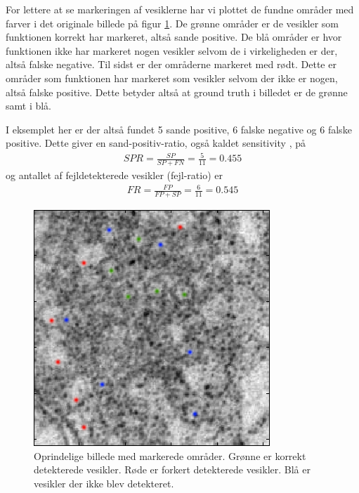 For lettere at se markeringen af vesiklerne har vi plottet de fundne områder med farver i det originale billede på figur \ref{fig:postmethod_conv_photoshop}. De grønne områder er de vesikler som funktionen korrekt har markeret, altså sande positive. De blå områder er hvor funktionen ikke har markeret nogen vesikler selvom de i virkeligheden er der, altså falske negative. Til sidst er der områderne markeret med rødt. Dette er områder som funktionen har markeret som vesikler selvom der ikke er nogen, altså falske positive. Dette betyder altså at ground truth i billedet er de grønne samt i blå.

I eksemplet her er der altså fundet 5 sande positive, 6 falske negative og 6 falske positive. Dette giver en sand-positiv-ratio, også kaldet sensitivity \cite{roc:sensitivity}, på
\begin{align}
	SPR = \frac{SP}{SP+FN} = \frac{5}{11} = 0.455
\end{align}
og antallet af fejldetekterede vesikler (fejl-ratio) er
\begin{align}
	FR = \frac{FP}{FP+SP} = \frac{6}{11} = 0.545
\end{align}

\begin{figure}[H]
		\centering
		\includegraphics[scale=0.65]{files/postmethod/img/conv_5.png}
	\caption{Oprindelige billede med markerede områder. Grønne er korrekt detekterede vesikler. Røde er forkert detekterede vesikler. Blå er vesikler der ikke blev detekteret.\label{fig:postmethod_conv_photoshop}}
\end{figure}

